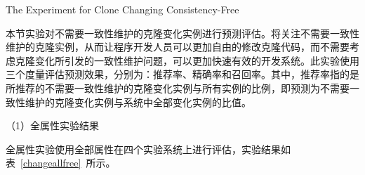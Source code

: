 
{The Experiment for Clone Changing Consistency-Free }

本节实验对不需要一致性维护的克隆变化实例进行预测评估。将关注不需要一致性维护的克隆实例，从而让程序开发人员可以更加自由的修改克隆代码，而不需要考虑克隆变化所引发的一致性维护问题，可以更加快速有效的开发系统。此实验使用三个度量评估预测效果，分别为：推荐率、精确率和召回率。其中，推荐率指的是所推荐的不需要一致性维护的克隆变化实例与所有实例的比例，即预测为不需要一致性维护的克隆变化实例与系统中全部变化实例的比值。


（1）全属性实验结果

全属性实验使用全部属性在四个实验系统上进行评估，实验结果如表~\ref{changeallfree}~所示。

